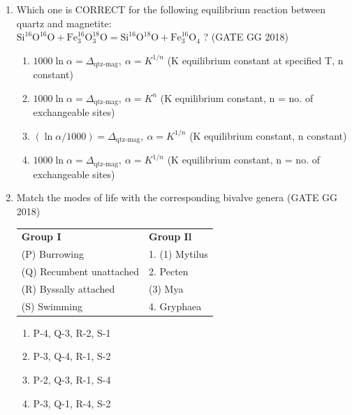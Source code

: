 \documentclass[journal]{IEEEtran}
\begin{document}
\begin{enumerate}[start=1]
\item Which one is CORRECT for the following equilibrium reaction between quartz and magnetite:\\ 
$\text{Si}^{16}\text{O}^{16}\text{O} + \text{Fe}_3^{16}\text{O}_3^{18}\text{O} = \text{Si}^{16}\text{O}^{18}\text{O} + \text{Fe}_3^{16}\text{O}_4$ ?  
\hfill(GATE GG 2018)
\begin{enumerate}
\item $1000 \ln \alpha = \Delta_{\text{qtz-mag}},\ \alpha = K^{1/n}$ (K equilibrium constant at specified T, n constant)
\item $1000 \ln \alpha = \Delta_{\text{qtz-mag}},\ \alpha = K^n$ (K equilibrium constant, n = no. of exchangeable sites)
\item $(\ln \alpha /1000) = \Delta_{\text{qtz-mag}},\ \alpha = K^{1/n}$ (K equilibrium constant, n constant)
\item $1000 \ln \alpha = \Delta_{\text{qtz-mag}},\ \alpha = K^{1/n}$ (K equilibrium constant, n = no. of exchangeable sites)
\end{enumerate}

\item Match the modes of life  with the corresponding bivalve genera 
\hfill(GATE GG 2018)\\
\begin{tabular}{ l l }
\textbf{Group I} & \textbf{Group Il}\\
(P) Burrowing & 1. (1) Mytilus\\
(Q) Recumbent unattached & 2. Pecten\\
(R) Byssally attached & (3) Mya\\
(S) Swimming & 4. Gryphaea
\end{tabular}
\begin{multicols}{2}
\begin{enumerate}
\item P-4, Q-3, R-2, S-1
\item P-3, Q-4, R-1, S-2
\item P-2, Q-3, R-1, S-4
\item P-3, Q-1, R-4, S-2
\end{enumerate}
\end{multicols}


\end{enumerate}
\end{document}

